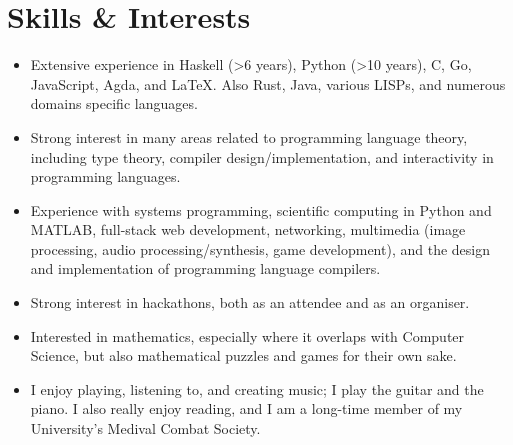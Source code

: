 \documentclass[12pt]{article}
\begin{document}
\section*{Skills \& Interests}
\begin{itemize}
	\item Extensive experience in Haskell (>6 years), Python (>10 years), C, Go, JavaScript, Agda, and \LaTeX. Also Rust, Java, various LISPs, and numerous domains specific languages.
	\item Strong interest in many areas related to programming language theory, including type theory, compiler design/implementation, and interactivity in programming languages.
	\item Experience with systems programming, scientific computing in Python and MATLAB, full-stack web development, networking, multimedia (image processing, audio processing/synthesis, game development), and the design and implementation of programming language compilers.
	\item Strong interest in hackathons, both as an attendee and as an organiser.
	\item Interested in mathematics, especially where it overlaps with Computer Science, but also mathematical puzzles and games for their own sake.
	\item I enjoy playing, listening to, and creating music; I play the guitar and the piano. I also really enjoy reading, and I am a long-time member of my University's Medival Combat Society.
\end{itemize}
\end{document}
